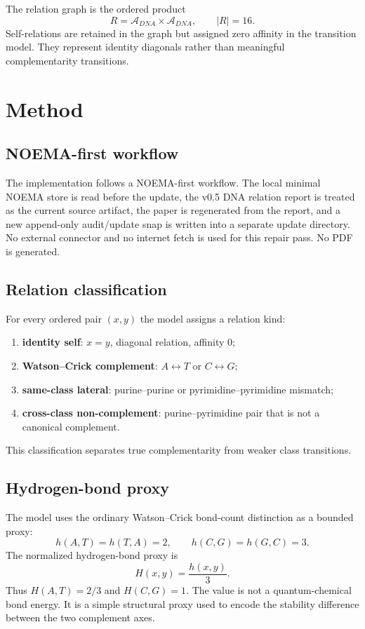 \documentclass[11pt]{article}
\begin{document}
The relation graph is the ordered product
\[
  R=\mathcal{A}_{DNA}\times\mathcal{A}_{DNA},\qquad |R|=16.
\]
Self-relations are retained in the graph but assigned zero affinity in the transition model. They represent identity diagonals rather than meaningful complementarity transitions.

\section{Method}
\subsection{NOEMA-first workflow}
The implementation follows a NOEMA-first workflow. The local minimal NOEMA store is read before the update, the v0.5 DNA relation report is treated as the current source artifact, the paper is regenerated from the report, and a new append-only audit/update snap is written into a separate update directory. No external connector and no internet fetch is used for this repair pass. No PDF is generated.

\subsection{Relation classification}
For every ordered pair $(x,y)$ the model assigns a relation kind:
\begin{enumerate}[leftmargin=2em]
  \item \textbf{identity self}: $x=y$, diagonal relation, affinity $0$;
  \item \textbf{Watson--Crick complement}: $A\leftrightarrow T$ or $C\leftrightarrow G$;
  \item \textbf{same-class lateral}: purine--purine or pyrimidine--pyrimidine mismatch;
  \item \textbf{cross-class non-complement}: purine--pyrimidine pair that is not a canonical complement.
\end{enumerate}
This classification separates true complementarity from weaker class transitions.

\subsection{Hydrogen-bond proxy}
The model uses the ordinary Watson--Crick bond-count distinction as a bounded proxy:
\[
  h(A,T)=h(T,A)=2,\qquad h(C,G)=h(G,C)=3.
\]
The normalized hydrogen-bond proxy is
\[
  H(x,y)=\frac{h(x,y)}{3}.
\]
Thus $H(A,T)=2/3$ and $H(C,G)=1$. The value is not a quantum-chemical bond energy. It is a simple structural proxy used to encode the stability difference between the two complement axes.
\end{document}
